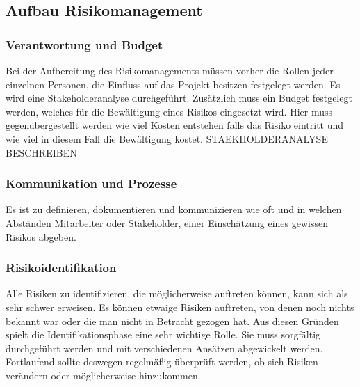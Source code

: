 \subsection{Aufbau Risikomanagement}
\subsubsection{Verantwortung und Budget}
Bei der Aufbereitung des Risikomanagements müssen vorher die Rollen jeder einzelnen Personen, die Einfluss auf das Projekt besitzen festgelegt werden. Es wird eine Stakeholderanalyse durchgeführt.
Zusätzlich muss ein Budget festgelegt werden, welches für die Bewältigung eines Risikos eingesetzt wird. Hier muss gegenübergestellt werden wie viel Kosten entstehen falls das Risiko eintritt und wie viel in diesem Fall die Bewältigung kostet.
STAEKHOLDERANALYSE BESCHREIBEN

\subsubsection{Kommunikation und Prozesse}
Es ist zu definieren, dokumentieren und kommunizieren wie oft und in welchen Abständen Mitarbeiter oder Stakeholder, einer Einschätzung eines gewissen Risikos abgeben. 

\subsubsection{Risikoidentifikation}
Alle Risiken zu identifizieren, die möglicherweise auftreten können, kann sich als sehr schwer erweisen. Es können etwaige Risiken auftreten, von denen noch nichts bekannt war oder die man nicht in Betracht gezogen hat. Aus diesen Gründen spielt die Identifikationsphase eine sehr wichtige Rolle. Sie muss sorgfältig durchgeführt werden und mit verschiedenen Ansätzen abgewickelt werden. Fortlaufend sollte deswegen regelmäßig überprüft werden, ob sich Risiken verändern oder möglicherweise hinzukommen.
\\

